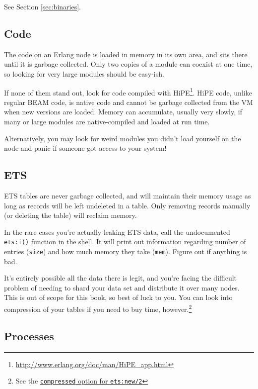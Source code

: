 \documentclass[11pt, oneside]{book}   	%
\newcommand{\function}[1]{\Verb`#1`}
\newcommand{\expression}[1]{\Verb`#1`}
\begin{document}
See Section \ref{sec:binaries}.

\subsection{Code}

The code on an Erlang node is loaded in memory in its own area, and sits there until it is garbage collected. Only two copies of a module can coexist at one time, so looking for very large modules should be easy-ish.

If none of them stand out, look for code compiled with HiPE\footnote{\href{http://www.erlang.org/doc/man/HiPE\_app.html}{http://www.erlang.org/doc/man/HiPE\_app.html}}. HiPE code, unlike regular BEAM code, is native code and cannot be garbage collected from the VM when new versions are loaded. Memory can accumulate, usually very slowly, if many or large modules are native-compiled and loaded at run time.

Alternatively, you may look for weird modules you didn't load yourself on the node and panic if someone got access to your system!

\subsection{ETS}

ETS tables are never garbage collected, and will maintain their memory usage as long as records will be left undeleted in a table. Only removing records manually (or deleting the table) will reclaim memory.

In the rare cases you're actually leaking ETS data, call the undocumented \function{ets:i()} function in the shell. It will print out information regarding number of entries (\expression{size}) and how much memory they take (\expression{mem}). Figure out if anything is bad.

It's entirely possible all the data there is legit, and you're facing the difficult problem of needing to shard your data set and distribute it over many nodes. This is out of scope for this book, so best of luck to you. You can look into compression of your tables if you need to buy time, however.\footnote{See the \href{http://www.erlang.org/doc/man/ets.html\#new-2}{\expression{compressed} option for \function{ets:new/2}}}

\subsection{Processes}
\end{document}
